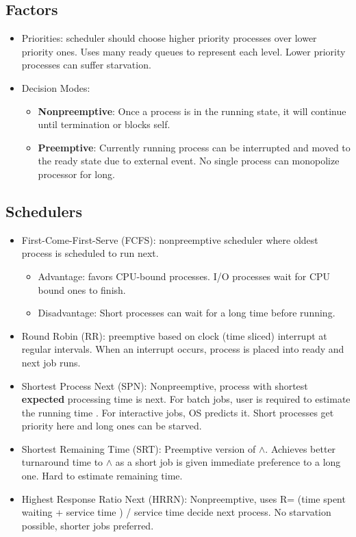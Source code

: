 \documentclass[fontsize=4.5pt]{scrartcl}
\begin{document}
\begin{multicols}{3}
      \subsection{Factors}
        \begin{itemize}
        \item Priorities: scheduler should choose higher priority processes over lower priority ones. Uses many ready queues to represent each level. Lower priority processes can suffer starvation.
        \item Decision Modes:
          \begin{itemize}
            \item \textbf{Nonpreemptive}: Once a process is in the running state, it will continue until termination or blocks self.
            \item \textbf{Preemptive}: Currently running process can be interrupted and moved to the ready state due to external event. No single process can monopolize processor for long.
          \end{itemize}
        \end{itemize}
      \subsection{Schedulers}
        \begin{itemize}
         \item First-Come-First-Serve (FCFS): nonpreemptive scheduler where oldest process is scheduled to run next.
         \begin{itemize}
           \item Advantage: favors CPU-bound processes. I/O processes wait for CPU bound ones to finish.
           \item Disadvantage: Short processes can wait for a long time before running.
         \end{itemize}
         \item Round Robin (RR): preemptive based on clock (time sliced) interrupt at regular intervals. When an interrupt occurs, process is placed into ready and next job runs.
         \item Shortest Process Next (SPN): Nonpreemptive, process with shortest \textbf{expected} processing time is next. For batch jobs, user is required to estimate the running time
               . For interactive jobs, OS predicts it. Short processes get priority here and long ones can be starved.
         \item Shortest Remaining Time (SRT): Preemptive version of $\wedge$. Achieves better turnaround time to $\wedge$ as a short job is given immediate preference to a long one. Hard to estimate remaining time.
         \item Highest Response Ratio Next (HRRN): Nonpreemptive, uses R= (time spent waiting + service time ) / service time decide next process. No starvation possible, shorter jobs preferred.
        \end{itemize}

\end{multicols}
\end{document}
